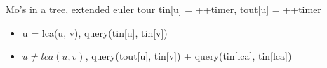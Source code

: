 
Mo's in a tree, extended euler tour tin[u] = ++timer, tout[u] = ++timer 

\begin{itemize}
\item u = lca(u, v), query(tin[u], tin[v])
\item $u \neq lca(u, v)$, query(tout[u], tin[v]) + query(tin[lca], tin[lca]) 
\end{itemize}


